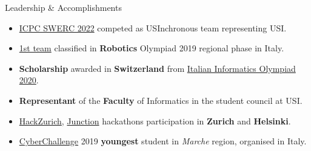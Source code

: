 \documentclass{cv} %
\begin{document}
\begin{minipage}[l]{0.7\linewidth}
\begin{rSection}{Leadership \& Accomplishments}
    \vspace{0.2cm}
    \begin{itemize}
        \itemsep 0.2em
    \item \href{https://swerc.eu/2022/teams/}{ICPC SWERC 2022}
        competed as USInchronous team representing USI. %

    \item \href{https://www.makerslab.it/olimpiadi-robotiche-ancona-2019/}{1st team}
        classified in \textbf{Robotics} Olympiad 2019 regional phase in Italy.

    \item \textbf{Scholarship} awarded in \textbf{Switzerland} from 
        \href{https://www.olimpiadi-informatica.it/index.php/selezione-territoriale-20.html}{Italian Informatics Olympiad 2020}.

    \item \textbf{Representant} of the \textbf{Faculty} of Informatics in the student council at USI.

    \item \href{https://hackzurich.com/}{HackZurich}, 
        \href{https://www.junction2023.com/}{Junction} 
        hackathons participation in \textbf{Zurich} and \textbf{Helsinki}.

    \item \href{https://cyberchallenge.it/}{CyberChallenge} 2019 \textbf{youngest} student
        in \textit{Marche} region, organised in Italy. 
    \end{itemize}
\end{rSection}

\end{minipage}
\end{document}
